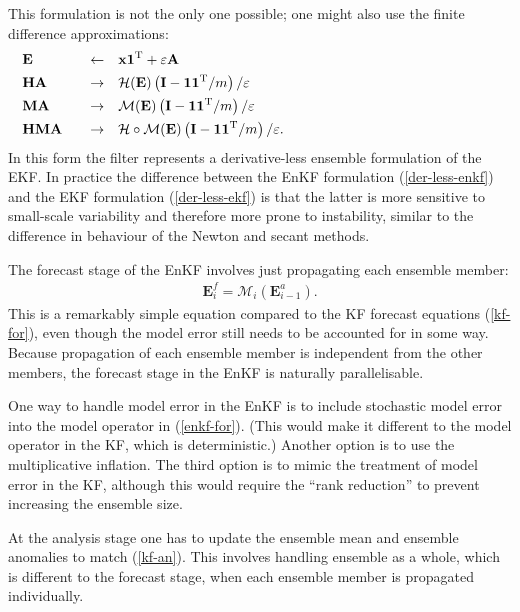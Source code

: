 \documentclass[11pt]{report}
\newcommand{\mb} {\mathbf}
\newcommand{\T}{^{\tiny \mathrm T}}
\begin{document}
This formulation is not the only one possible; one might also use the finite difference approximations:
\begin{subequations}
  \label{der-less-ekf}
  \begin{align}
    &\mb E \quad &\leftarrow& \quad \mb x \mb 1 \T  + \varepsilon \mb A \hspace{8cm}\\
    &\mb H \mb A \quad &\to& \quad \mathcal H(\mb E)\left(\mb I - \mb 1 \mb 1\T / m\right) / \varepsilon\\
    &\mb M \mb A \quad &\to& \quad \mathcal M(\mb E)\left(\mb I - \mb 1 \mb 1\T / m\right) / \varepsilon\\
    &\mb H \mb M \mb A \quad &\to& \quad \mathcal H \circ \mathcal M(\mb E)\left(\mb I - \mb 1 \mb 1\T / m\right) / \varepsilon.
  \end{align}
\end{subequations}
In this form the filter represents a derivative-less ensemble formulation of the EKF.
In practice the difference between the EnKF formulation (\ref{der-less-enkf}) and the EKF formulation (\ref{der-less-ekf}) is that the latter is more sensitive to small-scale variability and therefore more prone to instability, similar to the difference in behaviour of the Newton and secant methods.

The forecast stage of the EnKF involves just propagating each ensemble member:
\begin{align}
  \label{enkf-for}
  \mb E_i^f = \mathcal M_i(\mb E_{i-1}^a).
\end{align}
This is a remarkably simple equation compared to the KF forecast equations (\ref{kf-for}), even though the model error still needs to be accounted for in some way.
Because propagation of each ensemble member is independent from the other members, the forecast stage in the EnKF is naturally parallelisable.

One way to handle model error in the EnKF is to include stochastic model error into the model operator in (\ref{enkf-for}).
(This would make it different to the model operator in the KF, which is deterministic.)
Another option is to use the multiplicative inflation.
The third option is to mimic the treatment of model error in the KF, although this would require the ``rank reduction'' \citep[eq. 28]{ver97a} to prevent increasing the ensemble size.

At the analysis stage one has to update the ensemble mean and ensemble anomalies to match (\ref{kf-an}).
This involves handling ensemble as a whole, which is different to the forecast stage, when each ensemble member is propagated individually.
\end{document}
